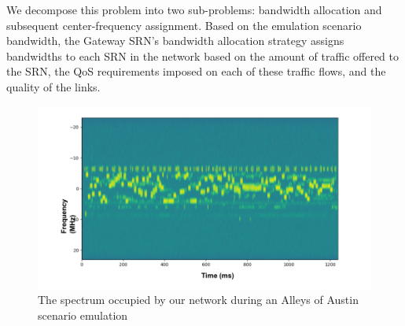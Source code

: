 We decompose this problem into two sub-problems: bandwidth allocation and subsequent center-frequency assignment. Based on the emulation scenario bandwidth, the Gateway SRN's bandwidth allocation strategy assigns bandwidths to each SRN in the network based on the amount of traffic offered to the SRN, the QoS requirements imposed on each of these traffic flows, and the quality of the links.
\begin{figure} [htb]
    \centerline{
    \includegraphics[width = 1.0\textwidth]{Alleys_of_Austin_Channel_Access.PNG}}
    \caption{The spectrum occupied by our network during an Alleys of Austin scenario emulation}
    \label{fig:B.5}
\end{figure}

